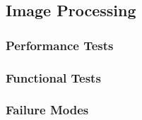 
\subsection{Image Processing}
\label{sec:verification_image}


\subsubsection{Performance Tests}
\label{sec:image_pt}

\subsubsection{Functional Tests}
\label{sec:image_ft}

\subsubsection{Failure Modes}
\label{sec:image_fm}
